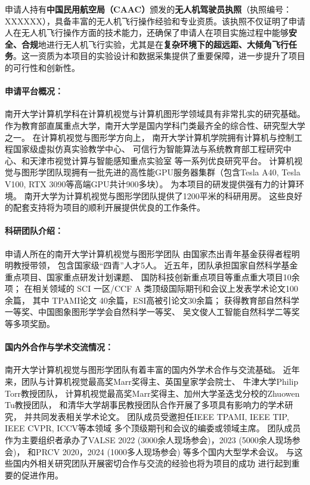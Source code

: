 \documentclass[12pt]{article}
\newcommand{\myPara}[1]{\paragraph{#1：}}
\newcommand{\myEmph}[1]{\textbf{\textcolor[rgb]{0,0,0.25}{#1}}}
\begin{document}
申请人持有\myEmph{中国民用航空局（CAAC）}颁发的\myEmph{无人机驾驶员执照}（执照编号：XXXXXX），具备丰富的无人机飞行操作经验和专业资质。该执照不仅证明了申请人在无人机飞行操作方面的技术能力，还确保了申请人在项目实施过程中能够\myEmph{安全、合规}地进行无人机飞行实验，尤其是在\myEmph{复杂环境下的超远距、大倾角飞行任务}。这一资质为本项目的实验设计和数据采集提供了重要保障，进一步提升了项目的可行性和创新性。





\myPara{申请平台概况}
南开大学计算机学科在计算机视觉与计算机图形学领域具有非常扎实的研究基础。
作为教育部直属重点大学，南开大学是国内学科门类最齐全的综合性、研究型大学之一。
在计算机视觉与图形学方向上，
南开大学计算机学院拥有计算机与控制工程国家级虚拟仿真实验教学中心、
可信行为智能算法与系统教育部工程研究中心、和天津市视觉计算与智能感知重点实验室
等一系列优良研究平台。
计算机视觉与图形学团队现拥有一批先进的高性能GPU服务器集群（包含Tesla A40, Tesla V100, RTX 3090等高端GPU共计900多块）。
% 
为本项目的研发提供强有力的计算环境。
南开大学为计算机视觉与图形学团队提供了1200平米的科研用房。
这些良好的配套支持将为项目的顺利开展提供优良的工作条件。


\myPara{科研团队介绍}

申请人所在的南开大学计算机视觉与图形学团队
由国家杰出青年基金获得者程明明教授带领，
包含国家级“四青”人才5人。
%
近五年，团队承担国家自然科学基金重点项目、国家重点研发计划课题、
国防科技创新重点项目等重点重大项目10余项；
在相关领域的 SCI 一区/CCF A 类顶级国际期刊和会议上发表学术论文100余篇，
其中 TPAMI论文 40余篇，ESI高被引论文30余篇；
获得教育部自然科学一等奖、中国图象图形学学会自然科学一等奖、
吴文俊人工智能自然科学二等奖等多项奖励。


\myPara{国内外合作与学术交流情况}

南开大学计算机视觉与图形学团队有着丰富的国内外学术合作与交流基础。
近年来，团队与计算机视觉最高奖Marr奖得主、英国皇家学会院士、
牛津大学Philip Torr教授团队，
计算机视觉最高奖Marr奖得主、加州大学圣迭戈分校的Zhuowen Tu教授团队，
和清华大学胡事民教授团队合作开展了多项具有影响力的学术研究，
并共同发表相关学术论文。
团队成员受邀担任IEEE TPAMI, IEEE TIP, IEEE CVPR, ICCV等本领域
多个顶级期刊和会议的编委或领域主席。
团队成员作为主要组织者承办了VALSE 2022 (3000余人现场参会)，2023 (5000余人现场参会)，
和PRCV 2020，2024 (1000多人现场参会)
等多个国内大型学术会议。
%
与这些国内外相关研究团队开展密切合作与交流的经验也将为项目的成功
进行起到重要的促进作用。
\end{document}
